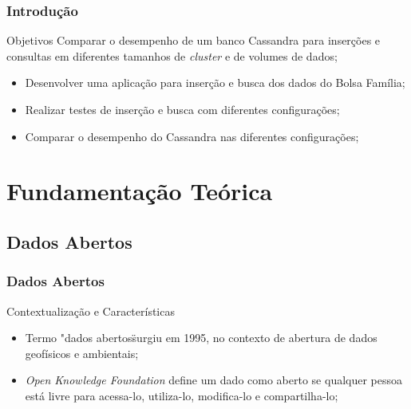 \documentclass[brazil]{beamer}
\begin{document}
\begin{frame}
\frametitle{Introdução}

\begin{block}{Objetivos}
	Comparar o desempenho de um banco Cassandra para inserções e consultas em diferentes tamanhos de \emph{cluster} e de volumes de dados;
	
	\begin{itemize}
		\item Desenvolver uma aplicação para inserção e busca dos dados do Bolsa Família;
		\item Realizar testes de inserção e busca com diferentes configurações;
		\item Comparar o desempenho do Cassandra nas diferentes configurações;
	\end{itemize}
\end{block}
\end{frame}

\section{Fundamentação Teórica}

\subsection{Dados Abertos}

\begin{frame}
	\frametitle{Dados Abertos}
	\begin{block}{Contextualização e Características}
		\begin{itemize}
			\item Termo "dados abertos\" surgiu em 1995, no contexto de abertura de dados geofísicos e ambientais;
			\item \emph{Open Knowledge Foundation} define um dado como aberto se qualquer pessoa está livre para acessa-lo, utiliza-lo, modifica-lo e compartilha-lo;
		\end{itemize}
	\end{block}
\end{frame}
	
\end{document}
